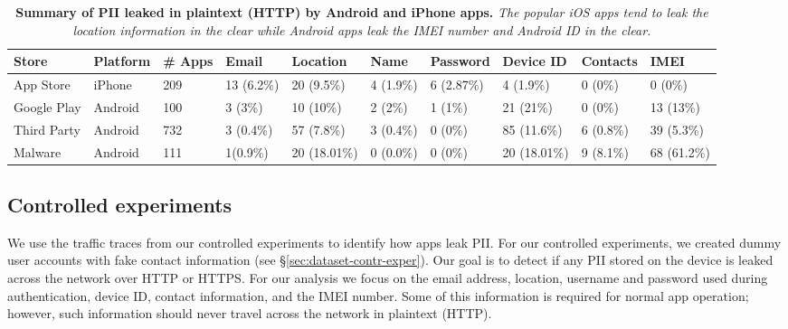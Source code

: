 \begin{table}[t]    
    \centering
    \begin{small}
    \begin{tabular}{|l|l|l|l|l|l|l|l|l|l|}
       \hline
       {\bf Store}&{\bf Platform}&{\bf \# Apps}&{\bf Email}& {\bf Location}& {\bf Name} &{\bf Password}& {\bf Device ID}& {\bf Contacts}& {\bf IMEI}\\
       \hline
       App Store&iPhone&209&13 (6.2\%) &20 (9.5\%)&4 (1.9\%)&6 (2.87\%)&4 (1.9\%)&0 (0\%)&0 (0\%)\\
       \hline
       Google Play&Android&100&3 (3\%)&10 (10\%)&2 (2\%)&1 (1\%)&21 (21\%)&0 (0\%)&13 (13\%)\\
       \hline
       Third Party&Android&732&3 (0.4\%)&57 (7.8\%)&3 (0.4\%)&0 (0\%)&85 (11.6\%)&6 (0.8\%)&39 (5.3\%)\\
       \hline
       Malware&Android&111&1(0.9\%)&20 (18.01\%)&0 (0.0\%)&0 (0\%)&20 (18.01\%)&9 (8.1\%)&68 (61.2\%)\\ 
       \hline  
    \end{tabular}
    \end{small}
    \caption{\textbf{Summary of PII leaked in plaintext (HTTP) by Android and iPhone apps.} \emph{The popular iOS apps tend to leak the location information in the clear while Android apps leak the IMEI number and Android ID in the clear.}}
    \vspace{\postfigspace}
    \label{tab:pii}
\end{table}

\subsection{Controlled experiments}
\label{subsec:exptpii}

We use the traffic traces from our controlled experiments to identify how apps leak PII. 
For our controlled experiments, we created dummy user accounts with fake contact information (see \S\ref{sec:dataset-contr-exper}).  
Our goal is to detect if any PII stored on the device is leaked across the network over HTTP or HTTPS.
For our analysis we focus on the email address, location, username and password used during authentication, device ID, contact information, and the IMEI number. 
Some of this information is required for normal app operation; however, such information should never travel across the network in plaintext (HTTP).  

